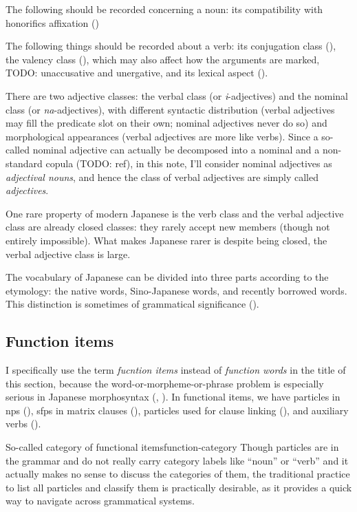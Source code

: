 \documentclass[UTF8, a4paper, oneside, scheme=plain]{ctexrep}
\newcommand*{\term}[1]{\emph{#1}}
\newcommand{\corpus}[1]{\emph{#1}}
\begin{document}
The following should be recorded concerning a noun:
its compatibility with honorifics affixation ()

The following things should be recorded about a verb:
its conjugation class (),
the valency class (),
which may also affect how the arguments are marked,
TODO: unaccusative and unergative,
and its lexical aspect ().

There are two adjective classes:
the verbal class (or \corpus{i}-adjectives)
and the nominal class (or \corpus{na}-adjectives),
with different syntactic distribution 
(verbal adjectives may fill the predicate slot on their own; nominal adjectives never do so)
and morphological appearances
(verbal adjectives are more like verbs).
Since a so-called nominal adjective 
can actually be decomposed into a nominal and a non-standard copula (TODO: ref),
in this note, I'll consider nominal adjectives as \emph{adjectival nouns},
and hence the class of verbal adjectives are simply called \emph{adjectives}.

One rare property of modern Japanese is the verb class and the verbal adjective class 
are already closed classes:
they rarely accept new members (though not entirely impossible).
What makes Japanese rarer is despite being closed,
the verbal adjective class is large.

The vocabulary of Japanese can be divided into three parts according to the etymology:
the native words,
Sino-Japanese words,
and recently borrowed words.
This distinction is sometimes of grammatical significance ().

\subsection{Function items}

I specifically use the term \term{fucntion items} instead of \term{function words}
in the title of this section,
because the word-or-morpheme-or-phrase problem is especially serious in Japanese morphosyntax
(, ).
In functional items,
we have particles in \acs{np}s (),
\acs{sfp}s in matrix clauses (),
particles used for clause linking (),
and auxiliary verbs ().

\begin{theorybox}{So-called category of functional items}{function-category}
    Though particles are in the grammar and do not really carry category labels like ``noun'' or ``verb''
    and it actually makes no sense to discuss the categories of them,
    the traditional practice to list all particles and classify them 
    is practically desirable, 
    as it provides a quick way to navigate across grammatical systems.
\end{theorybox}
\end{document}
